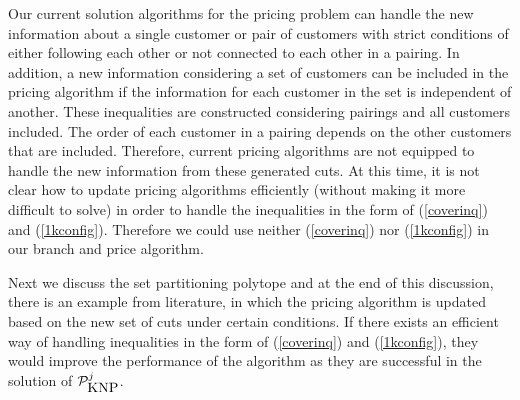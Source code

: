 Our current solution algorithms for the pricing problem can handle
the new information about a single customer or pair of customers
with strict conditions of either following each other or not
connected to each other in a pairing. In addition, a new
information considering a set of customers can be included in the
pricing algorithm if the information for each customer in the set is
independent of another. These inequalities are constructed
considering pairings and all customers included. The order of each
customer in a pairing depends on the other customers that are
included. Therefore, current pricing algorithms are not equipped to
handle the new information from these generated cuts. At this time,
it is not clear how to update pricing algorithms efficiently
(without making it more difficult to solve) in order to handle
the inequalities in the form of (\ref{coverinq}) and (\ref{1kconfig}).
Therefore we could use neither (\ref{coverinq}) nor (\ref{1kconfig})
in our branch and price algorithm.

Next we discuss the set partitioning polytope and at the end of this
discussion, there is an example from literature, in which the pricing
algorithm is updated based on the new set of cuts under certain conditions.
If there exists an efficient way of handling inequalities in the form
of (\ref{coverinq}) and (\ref{1kconfig}), they would improve the
performance of the algorithm as they are successful in the solution
of $\mathcal{P}^j_{\mbox{KNP}}$.





